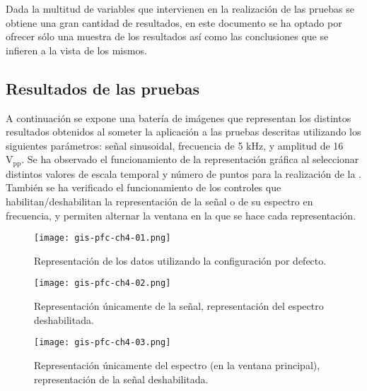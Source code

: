 Dada la multitud de variables que intervienen en la realización de las
pruebas se obtiene una gran cantidad de resultados, en este documento se ha
optado por ofrecer sólo una muestra de los resultados así como las
conclusiones que se infieren a la vista de los mismos.


\subsection{Resultados de las pruebas}

A continuación se expone una batería de imágenes que representan los
distintos resultados obtenidos al someter la aplicación a las pruebas
descritas utilizando los siguientes parámetros: señal sinusoidal,
frecuencia de 5 kHz, y amplitud de 16 $\text{V}_\text{pp}$. Se ha observado
el funcionamiento de la representación gráfica al seleccionar distintos
valores de escala temporal y número de puntos para la realización de la
. También se ha verificado el funcionamiento de los controles que
habilitan/deshabilitan la representación de la señal o de su espectro en
frecuencia, y permiten alternar la ventana en la que se hace cada
representación.

\begin{figure}
    \begin{center}
	\texttt{[image: gis-pfc-ch4-01.png]}
    \end{center}
    \caption[Representaciones obtenidas utilizando diversas
    configuraciones]{Representación de los datos utilizando la
    configuración por defecto.}
    \label{fig:test1}
\end{figure}

\begin{figure}\ContinuedFloat
    \begin{center}
	\texttt{[image: gis-pfc-ch4-02.png]}
    \end{center}
    \caption[]{Representación únicamente de la señal, representación del
    espectro deshabilitada.}
    \label{fig:test2}
\end{figure}

\begin{figure}\ContinuedFloat
    \begin{center}
	\texttt{[image: gis-pfc-ch4-03.png]}
    \end{center}
    \caption[]{Representación únicamente del espectro (en la ventana
    principal), representación de la señal deshabilitada.}
    \label{fig:test3}
\end{figure}

